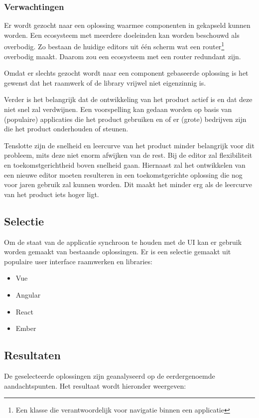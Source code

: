 \subsubsection{Verwachtingen}
Er wordt gezocht naar een oplossing waarmee componenten in gekapseld kunnen worden. Een ecosysteem met meerdere doeleinden kan worden beschouwd als overbodig. Zo bestaan de huidige editors uit één scherm wat een router\footnote{Een klasse die verantwoordelijk voor navigatie binnen een applicatie} overbodig maakt. Daarom zou een ecosysteem met een router redundant zijn.

Omdat er slechts gezocht wordt naar een component gebaseerde oplossing is het gewenst dat het raamwerk of de library vrijwel niet eigenzinnig is.

Verder is het belangrijk dat de ontwikkeling van het product actief is en dat deze niet snel zal verdwijnen. Een voorspelling kan gedaan worden op basis van (populaire) applicaties die het product gebruiken en of er (grote) bedrijven zijn die het product onderhouden of steunen.

Tenslotte zijn de snelheid en leercurve van het product minder belangrijk voor dit probleem, mits deze niet enorm afwijken van de rest. Bij de editor zal flexibiliteit en toekomstgerichtheid boven snelheid gaan. Hiernaast zal het ontwikkelen van een nieuwe editor moeten resulteren in een toekomstgerichte oplossing die nog voor jaren gebruik zal kunnen worden. Dit maakt het minder erg als de leercurve van het product iets hoger ligt.

\subsection{Selectie}
Om de staat van de applicatie synchroon te houden met de UI kan er gebruik worden gemaakt van bestaande oplossingen. Er is een selectie gemaakt uit populaire user interface raamwerken en libraries:
\begin{itemize}
    \item Vue
    \item Angular
    \item React
    \item Ember    
\end{itemize}

\subsection{Resultaten}
De geselecteerde oplossingen zijn geanalyseerd op de eerdergenoemde aandachtspunten. Het resultaat wordt hieronder weergeven:

